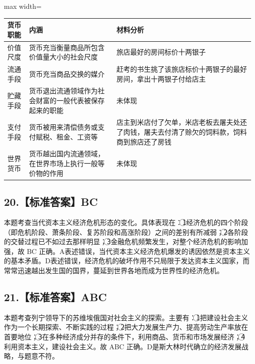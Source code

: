 \documentclass[UTF8,11pt]{ctexart}
\begin{document}
\begin{center}\begin{adjustbox}{max width=\linewidth}\begin{tabular}{|>{\raggedright\arraybackslash}p{\dimexpr(\linewidth-6\tabcolsep-4\arrayrulewidth)/3\relax}|>{\raggedright\arraybackslash}p{\dimexpr(\linewidth-6\tabcolsep-4\arrayrulewidth)/3\relax}|>{\raggedright\arraybackslash}p{\dimexpr(\linewidth-6\tabcolsep-4\arrayrulewidth)/3\relax}|}\hline
货币职能 & 内涵 & 材料分析\\\hline
价值尺度 & 货币充当衡量商品所包含价值量大小的社会尺度 & 旅店最好的房间标价十两银子\\\hline
流通手段 & 货币充当商品交换的媒介 & 赶考的书生挑了该旅店标价十两银子的最好房间，拿出十两银子付给店主\\\hline
贮藏手段 & 货币退出流通领域作为社会财富的一般代表被保存起来的职能 & 未体现\\\hline
支付手段 & 货币被用来清偿债务或支付赋税、租金、工资等 & 店主到米店付了欠单，米店老板去屠夫处还了肉钱，屠夫去付清了赊欠的饲料款，饲料商到旅店还了房钱\\\hline
世界货币 & 货币越出国内流通领域，在世界市场上执行一般等价物的作用 & 未体现\\\hline\end{tabular}\end{adjustbox}\end{center}

\subsection*{20.【标准答案】BC}

本题考查当代资本主义经济危机形态的变化。具体表现在：\textcircled{1}经济危机的四个阶段（即危机阶段、萧条阶段、复苏阶段和高涨阶段）之间的差别有所减弱；\textcircled{2}各阶段的交替过程已不如过去那样明显；\textcircled{3}金融危机频繁发生，对整个经济危机的影响加强，故 BC 正确。A表述错误，当代资本主义经济危机爆发的诱因依然是资本主义的基本矛盾。D表述错误，经济危机的破坏作用不只局限于发达资本主义国家，而常常迅速越出发生国的国界，蔓延到世界各地而成为世界性的经济危机。


\subsection*{21.【标准答案】ABC}

本题考查列宁领导下的苏维埃俄国对社会主义的探索。主要有：\textcircled{1}把建设社会主义作为一个长期探索、不断实践的过程；\textcircled{2}把大力发展生产力、提高劳动生产率放在首要地位；\textcircled{3}在多种经济成分并存的条件下，利用商品、货币和市场发展经济；\textcircled{4}利用资本主义，建设社会主义。故 ABC 正确。D是斯大林时代确立的经济发展战略，与题意不符。
\end{document}
